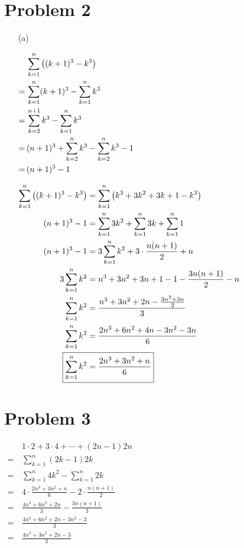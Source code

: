 \documentclass{article}
\begin{document}
\section*{Problem 2}
\begin{itemize}
\item[(a)]
\begin{minipage}[t]{0.33\linewidth}
$\begin{aligned}[t]
	&\sum_{k=1}^{n}\left((k+1)^3-k^3\right) \\
	=\,&\sum_{k=1}^{n}(k+1)^3-\sum_{k=1}^{n}k^3 \\
	=\,&\sum_{k=2}^{n+1}k^3-\sum_{k=1}^{n}k^3 \\
	=\,&(n+1)^3+\sum_{k=2}^{n}k^3-\sum_{k=2}^{n}k^3-1 \\
	=\,&(n+1)^3-1
\end{aligned} \\$
\end{minipage}
\begin{minipage}[t]{0.66\linewidth}
$\begin{aligned}[t]
	\sum_{k=1}^{n}\left((k+1)^3-k^3\right)&=
		\sum_{k=1}^{n}\left(k^3+3k^2+3k+1-k^3\right) \\
	(n+1)^3-1&=\sum_{k=1}^{n}3k^2+\sum_{k=1}^{n}3k+\sum_{k=1}^{n}1 \\
	(n+1)^3-1&=3\sum_{k=1}^{n}k^2+3\cdot\frac{n(n+1)}{2}+n \\
	3\sum_{k=1}^{n}k^2&=n^3+3n^2+3n+1-1-\frac{3n(n+1)}{2}-n \\
	\sum_{k=1}^{n}k^2&=\frac{n^3+3n^2+2n-\frac{3n^2+3n}{2}}{3} \\
	\sum_{k=1}^{n}k^2&=\frac{2n^3+6n^2+4n-3n^2-3n}{6} \\
	\Aboxed{\sum_{k=1}^{n}k^2&=\frac{2n^3+3n^2+n}{6}} \\
\end{aligned}$
\end{minipage}
\end{itemize}

\section*{Problem 3}
$\begin{aligned}
	&1\cdot2+3\cdot4+\cdots+(2n-1)2n \\
	=\,&\sum_{k=1}^{n}(2k-1)2k \\
	=\,&\sum_{k=1}^{n}4k^2-\sum_{k=1}^{n}2k \\
	=\,&4\cdot\frac{2n^3+3n^2+n}{6}-2\cdot\frac{n(n+1)}{2} \\
	=\,&\frac{4n^3+6n^2+2n}{3}-\frac{3n(n+1)}{3} \\
	=\,&\frac{4n^3+6n^2+2n-3n^2-3}{3} \\
	=\,&\boxed{\frac{4n^3+3n^2+2n-3}{3}} \\
\end{aligned}$
\end{document}

